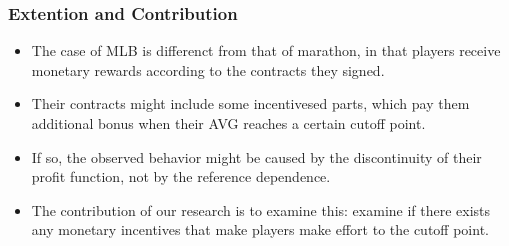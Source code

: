 \documentclass[dvipdfmx,12pt]{beamer}
\begin{document}
\begin{frame}\frametitle{Extention and Contribution}
\begin{itemize}
  \item The case of MLB is differenct from that of marathon, in that players receive monetary rewards according to the contracts they signed.

  \item Their contracts might include some incentivesed parts, which pay them additional bonus when their AVG reaches a certain cutoff point.

  \item If so, the observed behavior might be caused by the discontinuity of their profit function, not by the reference dependence.

  \item The contribution of our research is to examine this: examine if there exists any monetary incentives that make players make effort to the cutoff point.
\end{itemize}
\end{frame}
\end{document}
